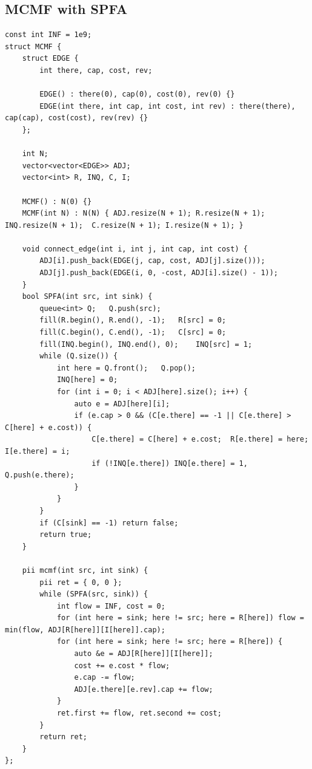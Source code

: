 \documentclass[landscape, 8pt, a4paper, oneside, twocolumn]{extarticle}
\begin{document}
\subsection{MCMF with SPFA}
\begin{verbatim}
const int INF = 1e9;
struct MCMF {
	struct EDGE {
		int there, cap, cost, rev;

		EDGE() : there(0), cap(0), cost(0), rev(0) {}
		EDGE(int there, int cap, int cost, int rev) : there(there), cap(cap), cost(cost), rev(rev) {}
	};

	int N;
	vector<vector<EDGE>> ADJ;
	vector<int> R, INQ, C, I;

	MCMF() : N(0) {}
	MCMF(int N) : N(N) { ADJ.resize(N + 1); R.resize(N + 1); INQ.resize(N + 1);	 C.resize(N + 1); I.resize(N + 1); }

	void connect_edge(int i, int j, int cap, int cost) {
		ADJ[i].push_back(EDGE(j, cap, cost, ADJ[j].size()));
		ADJ[j].push_back(EDGE(i, 0, -cost, ADJ[i].size() - 1));
	}
	bool SPFA(int src, int sink) {
		queue<int> Q;	Q.push(src);
		fill(R.begin(), R.end(), -1);	R[src] = 0;
		fill(C.begin(), C.end(), -1);	C[src] = 0;
		fill(INQ.begin(), INQ.end(), 0);	INQ[src] = 1;
		while (Q.size()) {
			int here = Q.front();	Q.pop();
			INQ[here] = 0;
			for (int i = 0; i < ADJ[here].size(); i++) {
				auto e = ADJ[here][i];
				if (e.cap > 0 && (C[e.there] == -1 || C[e.there] > C[here] + e.cost)) {
					C[e.there] = C[here] + e.cost;	R[e.there] = here;	I[e.there] = i;
					if (!INQ[e.there]) INQ[e.there] = 1, Q.push(e.there);
				}
			}
		}
		if (C[sink] == -1) return false;
		return true;
	}

	pii mcmf(int src, int sink) {
		pii ret = { 0, 0 };
		while (SPFA(src, sink)) {
			int flow = INF, cost = 0;
			for (int here = sink; here != src; here = R[here]) flow = min(flow, ADJ[R[here]][I[here]].cap);
			for (int here = sink; here != src; here = R[here]) {
				auto &e = ADJ[R[here]][I[here]];
				cost += e.cost * flow;
				e.cap -= flow;
				ADJ[e.there][e.rev].cap += flow;
			}
			ret.first += flow, ret.second += cost;
		}
		return ret;
	}
};
\end{verbatim}
\end{document}
